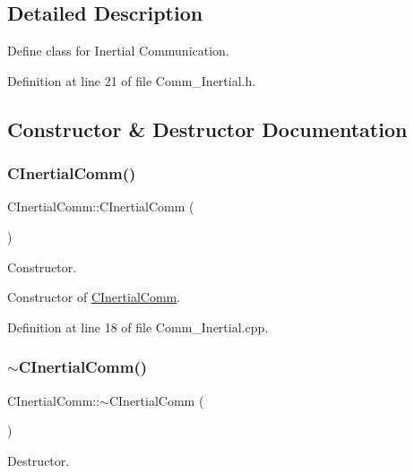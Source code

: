 \subsection{Detailed Description}
Define class for Inertial Communication. 

Definition at line 21 of file Comm\+\_\+\+Inertial.\+h.



\subsection{Constructor \& Destructor Documentation}
\mbox{\label{class_c_inertial_comm_a86917a157b0acfa80c9f178f18d882fc}} 
\subsubsection{\texorpdfstring{C\+Inertial\+Comm()}{CInertialComm()}}
{\footnotesize\ttfamily C\+Inertial\+Comm\+::\+C\+Inertial\+Comm (\begin{DoxyParamCaption}{ }\end{DoxyParamCaption})}



Constructor. 

Constructor of \mbox{\hyperlink{class_c_inertial_comm}{C\+Inertial\+Comm}}. 

Definition at line 18 of file Comm\+\_\+\+Inertial.\+cpp.

\mbox{\label{class_c_inertial_comm_a7673549eec2f597714a39b2c4f5ab3ae}} 
\subsubsection{\texorpdfstring{$\sim$\+C\+Inertial\+Comm()}{~CInertialComm()}}
{\footnotesize\ttfamily C\+Inertial\+Comm\+::$\sim$\+C\+Inertial\+Comm (\begin{DoxyParamCaption}{ }\end{DoxyParamCaption})}



Destructor. 

